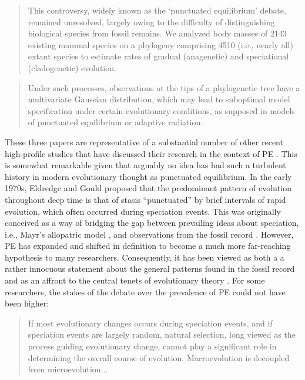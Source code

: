 \begin{quote}
\singlespacing
This controversy, widely known as the `punctuated equilibrium' debate, remained unresolved, largely owing to the difficulty of distinguishing biological species from fossil remains. We analyzed body masses of 2143 existing mammal species on a phylogeny comprising 4510 (i.e., nearly all) extant species to estimate rates of gradual (anagenetic) and speciational (cladogenetic) evolution. \citep[][p. 2195]{Mattila2008}
\end{quote}

\begin{quote}
\singlespacing
Under such processes, observations at the tips of a phylogenetic tree have a multivariate Gaussian distribution, which may lead to suboptimal model specification under certain evolutionary conditions, as supposed in models of punctuated equilibrium or adaptive radiation. \citep[][p. 193]{Landis2012}
\end{quote}
These three papers are representative of a substantial number of other recent high-profile studies that have discussed their research in the context of PE \citep[e.g.,][]{Bokma2002, Bokma2008, Webster2003, Hunt2007, Hunt2008, Hunt2012, Huntetal2008, Atkinson2008,Ingram2011, Uyeda2011, Rabosky2012, Rabosky2013, Simpson2013,  Baca2013,Bartoszek2013}. This is somewhat remarkable given that arguably no idea has had such a turbulent history in modern evolutionary thought as punctuated equilibrium. In the early 1970s, Eldredge and Gould \citep{Eldredge1971, EldredgeGould1972, GouldEldredge1977} proposed that the predominant pattern of evolution throughout deep time is that of stasis ``punctuated'' by brief intervals of rapid evolution, which often occurred during speciation events. This was originally conceived as a way of bridging the gap between prevailing ideas about speciation, i.e., Mayr's allopatric model \citeyearpar{Mayr}, and observations from the fossil record \citep{Sepkoskibook}. However, PE has expanded and shifted in definition to become a much more far-reaching hypothesis to many researchers. Consequently, it has been viewed as both a a rather innocuous statement about the general patterns found in the fossil record and as an affront to the central tenets of evolutionary theory \citep{Stanley1975, Stanley1979, Gould1980, Charlesworth1982, Levinton2001}. For some researchers, the stakes of the debate over the prevalence of PE could not have been higher:

\begin{quote}
\singlespacing
If most evolutionary changes occurs during speciation events, and if speciation events are largely random, natural selection, long viewed as the process guiding evolutionary change, cannot play a significant role in determining the overall course of evolution. Macroevolution is decoupled from microevolution... \citep[][p. 648]{Stanley1975}
\end{quote}

